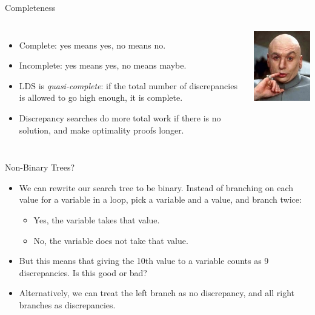 \documentclass{beamer}
\begin{document}
\begin{frame}{Completeness}
    \begin{columns}
        \begin{itemize}
            \item Complete: yes means yes, no means no.
            \item Incomplete: yes means yes, no means maybe.
            \item LDS is \emph{quasi-complete}: if the total number of discrepancies is allowed to go
                high enough, it is complete.
            \item Discrepancy searches do more total work if there is no solution, and make
                optimality proofs longer.
        \end{itemize}
        \centering\includegraphics[keepaspectratio=true,scale=0.4]{quasi.jpg}
    \end{columns}
\end{frame}

\begin{frame}{Non-Binary Trees?}
    \begin{itemize}
        \item We can rewrite our search tree to be binary. Instead of branching on each value for a
            variable in a loop, pick a variable and a value, and branch twice:

            \begin{itemize}
                \item Yes, the variable takes that value.
                \item No, the variable does not take that value.
            \end{itemize}

        \item But this means that giving the 10th value to a variable counts as 9 discrepancies. Is
            this good or bad?

        \item Alternatively, we can treat the left branch as no discrepancy, and all right branches
            as discrepancies.
    \end{itemize}
\end{frame}
\end{document}

